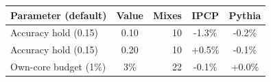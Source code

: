 \begin{tabular}{lcrcc}
\toprule
Parameter (default) & Value & Mixes & IPCP & Pythia \\
\midrule
Accuracy hold (0.15) & 0.10 & 10 & -1.3\% & -0.2\% \\
Accuracy hold (0.15) & 0.20 & 10 & +0.5\% & -0.1\% \\
Own-core budget (1\%) & 3\% & 22 & -0.1\% & +0.0\% \\
\bottomrule
\end{tabular}
